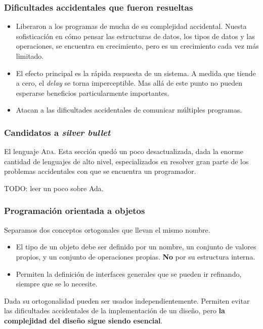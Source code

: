 \documentclass{beamer}
\begin{document}
\begin{frame}[fragile]
  \frametitle{Dificultades accidentales que fueron resueltas}

  \begin{itemize}
    \item[Lenguajes de alto nivel]
      Liberaron a los programas de mucha de su complejidad accidental.
      Nuesta sofisticaci\'on en c\'omo pensar las estructuras de datos, los tipos
      de datos y las operaciones, se encuentra en crecimiento, pero es un crecimiento
      cada vez m\'as limitado.
    \item[Tiempo compartido]
      El efecto principal es la r\'apida respuesta de un sistema. A medida que
      tiende a cero, el \textit{delay} se torna imperceptible. Mas all\'a de
      este punto no pueden esperarse beneficios particularmente importantes.
    \item[Ambientes de programaci\'on unificados]
      Atacan a las dificultades accidentales de comunicar m\'ultiples programas.
  \end{itemize}
\end{frame}


\begin{frame}[fragile]
  \frametitle{Candidatos a \textit{silver bullet}}

  El lenguaje \textsc{Ada}.
  Esta secci\'on qued\'o un poco desactualizada, dada la enorme cantidad de
  lenguajes de alto nivel, especializados en resolver gran parte de los
  problemas accidentales con que se encuentra un programador.

  TODO: leer un poco sobre Ada.
\end{frame}


\begin{frame}[fragile]
  \frametitle{Programaci\'on orientada a objetos}
  Separamos dos conceptos ortogonales que llevan el mismo nombre.
  \begin{itemize}
    \item[Tipos abstractos de datos] El tipo de un objeto debe ser
      definido por un nombre, un conjunto de valores propios, y un conjunto
      de operaciones propias. \textbf{No} por su estructura interna.
    \item[Tipos jer\'arquicos] Permiten la definici\'on de interfaces generales
      que se pueden ir refinando, siempre que se lo necesite.
  \end{itemize}

  Dada su ortogonalidad pueden ser usados independientemente.
  Permiten evitar las dificultades accidentales de la implementaci\'on de un
  dise\~no, pero \textbf{la complejidad del dise\~no sigue siendo esencial}.
\end{frame}
\end{document}
